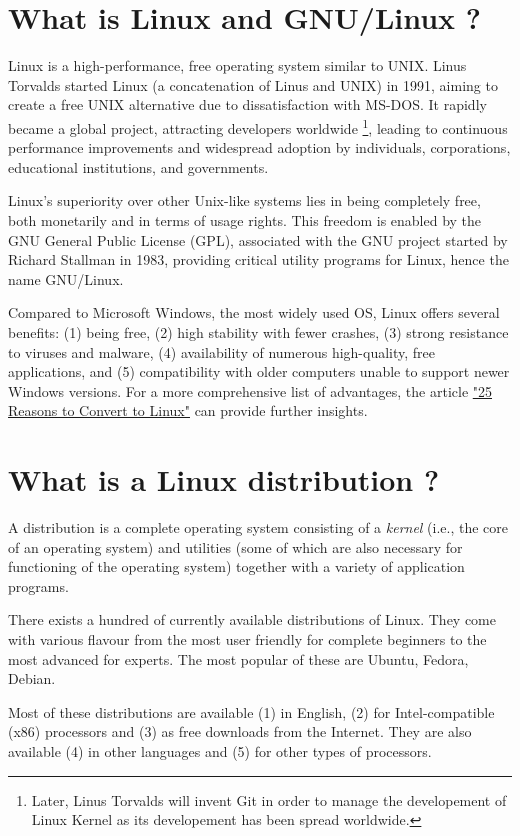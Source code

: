 \documentclass[11pt]{article}
\begin{document}
\section{What is Linux and GNU/Linux ?}
Linux is a high-performance, free operating system similar to UNIX. Linus Torvalds started Linux (a concatenation of Linus and UNIX) in 1991, aiming to create a free UNIX alternative due to dissatisfaction with MS-DOS. It rapidly became a global project, attracting developers worldwide \footnote{Later, Linus Torvalds will invent Git in order to manage the developement of Linux Kernel as its developement has been spread worldwide.}, leading to continuous performance improvements and widespread adoption by individuals, corporations, educational institutions, and governments.

Linux's superiority over other Unix-like systems lies in being completely free, both monetarily and in terms of usage rights. This freedom is enabled by the GNU General Public License (GPL), associated with the GNU project started by Richard Stallman in 1983, providing critical utility programs for Linux, hence the name GNU/Linux.

Compared to Microsoft Windows, the most widely used OS, Linux offers several benefits: (1) being free, (2) high stability with fewer crashes, (3) strong resistance to viruses and malware, (4) availability of numerous high-quality, free applications, and (5) compatibility with older computers unable to support newer Windows versions. For a more comprehensive list of advantages, the article \href{http://www.linfo.org/reasons_to_convert.html}{"25 Reasons to Convert to Linux"} can provide further insights.

\section{What is a Linux distribution ?}

A distribution is a complete operating system consisting of a \emph{kernel} (i.e., the core of an operating system) and utilities (some of which are also necessary for functioning of the operating system) together with a variety of application programs. 

There exists a hundred of currently available distributions of Linux. They come with various flavour from the most user friendly for complete beginners to the most advanced for experts. The most popular of these are Ubuntu, Fedora, Debian.

Most of these distributions are available (1) in English, (2) for Intel-compatible (x86) processors and (3) as free downloads from the Internet. They are also available (4) in other languages and (5) for other types of processors.
\end{document}
